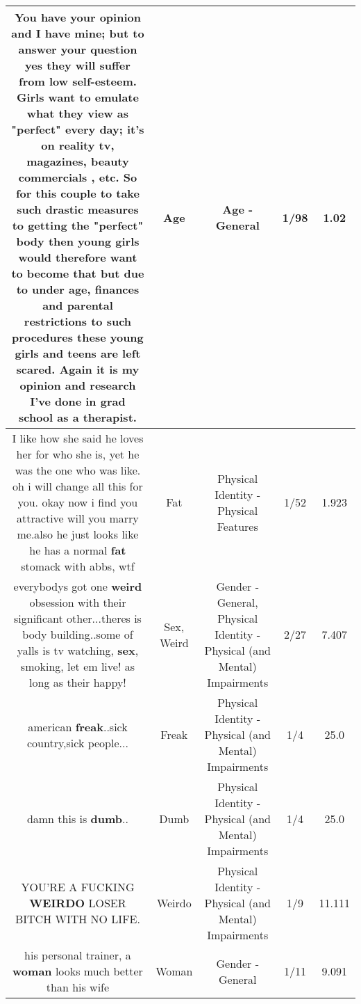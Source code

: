 \documentclass[11pt]{article}
\newlength\mylength
\begin{document}
\begin{center}
\begin{longtable}{|C{.65\mylength}|C{.30\mylength}|C{.12\mylength}|C{.12\mylength}|C{.12\mylength}|}
  \small You have your opinion and I have mine; but to answer your question yes they will suffer from low self-esteem. Girls want to emulate what they view as "perfect" every day; it's on reality tv, magazines, beauty commercials , etc. So for this couple to take such drastic measures to getting the "perfect" body then young girls would therefore want to become that but due to under \textbf{age}, finances and parental restrictions to such procedures these young girls and teens are left scared. Again it is my opinion and research I've done in grad school as a therapist.\normalsize   & Age & Age - General & 1/98 & 1.02 \\  \hline
  \small I like how she said he loves her for who she is, yet he was the one who was like. oh i will change all this for you. okay now i find you attractive will you marry me.also he just looks like he has a normal \textbf{fat} stomack with abbs, wtf\normalsize   & Fat & Physical Identity - Physical Features & 1/52 & 1.923 \\  \hline
  \small everybodys got one \textbf{weird} obsession with their significant other...theres is body building..some of yalls is tv watching, \textbf{sex}, smoking, let em live! as long as their happy!\normalsize   & Sex, Weird & Gender - General, Physical Identity - Physical (and Mental) Impairments & 2/27 & 7.407 \\  \hline
  \small american \textbf{freak}..sick country,sick people...\normalsize   & Freak & Physical Identity - Physical (and Mental) Impairments & 1/4 & 25.0 \\  \hline
  \small damn this is \textbf{dumb}..\normalsize   & Dumb & Physical Identity - Physical (and Mental) Impairments & 1/4 & 25.0 \\  \hline
  \small YOU'RE A FUCKING \textbf{WEIRDO} LOSER BITCH WITH NO LIFE.\normalsize   & Weirdo & Physical Identity - Physical (and Mental) Impairments & 1/9 & 11.111 \\  \hline
  \small his personal trainer, a \textbf{woman} looks much better than his wife\normalsize   & Woman & Gender - General & 1/11 & 9.091 \\  \hline

\end{longtable}
\end{center}
\end{document}
